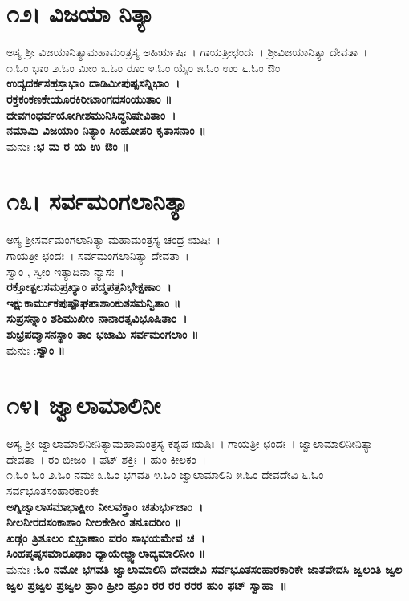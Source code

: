 \section{೧೨। ವಿಜಯಾ ನಿತ್ಯಾ}
ಅಸ್ಯ ಶ್ರೀ ವಿಜಯಾನಿತ್ಯಾಮಹಾಮಂತ್ರಸ್ಯ ಅಹಿರ್ಋಷಿಃ~। ಗಾಯತ್ರೀಛಂದಃ~। ಶ್ರೀವಿಜಯಾನಿತ್ಯಾ ದೇವತಾ~।\\
೧.ಓಂ ಭಾಂ ೨.ಓಂ ಮೀಂ ೩.ಓಂ ರೂಂ ೪.ಓಂ ಯೈಂ ೫.ಓಂ ಉಂ ೬.ಓಂ ಔಂ \\
{\bfseries ಉದ್ಯದರ್ಕಸಹಸ್ರಾಭಾಂ ದಾಡಿಮೀಪುಷ್ಪಸನ್ನಿಭಾಂ~।\\
ರಕ್ತಕಂಕಣಕೇಯೂರಕಿರೀಟಾಂಗದಸಂಯುತಾಂ ॥\\
ದೇವಗಂಧರ್ವಯೋಗೀಶಮುನಿಸಿದ್ಧನಿಷೇವಿತಾಂ~।\\
ನಮಾಮಿ ವಿಜಯಾಂ ನಿತ್ಯಾಂ ಸಿಂಹೋಪರಿ ಕೃತಾಸನಾಂ ॥\\}
ಮನುಃ :{\bfseries  ಭ ಮ ರ ಯ ಉ ಔಂ ॥}
\section{೧೩। ಸರ್ವಮಂಗಲಾನಿತ್ಯಾ}
ಅಸ್ಯ ಶ್ರೀಸರ್ವಮಂಗಲಾನಿತ್ಯಾ ಮಹಾಮಂತ್ರಸ್ಯ ಚಂದ್ರ ಋಷಿಃ~।\\ ಗಾಯತ್ರೀ ಛಂದಃ~। ಸರ್ವಮಂಗಲಾನಿತ್ಯಾ ದೇವತಾ~।\\
ಸ್ವಾಂ , ಸ್ವೀಂ ಇತ್ಯಾದಿನಾ ನ್ಯಾಸಃ~।\\
{\bfseries ರಕ್ತೋತ್ಪಲಸಮಪ್ರಖ್ಯಾಂ ಪದ್ಮಪತ್ರನಿಭೇಕ್ಷಣಾಂ~।\\
ಇಕ್ಷುಕಾರ್ಮುಕಪುಷ್ಪೌಘಪಾಶಾಂಕುಶಸಮನ್ವಿತಾಂ ॥\\
ಸುಪ್ರಸನ್ನಾಂ ಶಶಿಮುಖೀಂ ನಾನಾರತ್ನವಿಭೂಷಿತಾಂ~।\\
ಶುಭ್ರಪದ್ಮಾಸನಸ್ಥಾಂ ತಾಂ ಭಜಾಮಿ ಸರ್ವಮಂಗಲಾಂ ॥\\}
ಮನುಃ :{\bfseries  ಸ್ವೌಂ ॥}
\section{೧೪। ಜ್ವಾಲಾಮಾಲಿನೀ}
ಅಸ್ಯ ಶ್ರೀ ಜ್ವಾಲಾಮಾಲಿನೀನಿತ್ಯಾಮಹಾಮಂತ್ರಸ್ಯ ಕಶ್ಯಪ ಋಷಿಃ~। ಗಾಯತ್ರೀ ಛಂದಃ~। ಜ್ವಾಲಾಮಾಲಿನೀನಿತ್ಯಾ ದೇವತಾ~। ರಂ ಬೀಜಂ~। ಫಟ್ ಶಕ್ತಿಃ~। ಹುಂ ಕೀಲಕಂ~।\\
೧.ಓಂ ಓಂ ೨.ಓಂ ನಮಃ ೩.ಓಂ ಭಗವತಿ ೪.ಓಂ ಜ್ವಾಲಾಮಾಲಿನಿ ೫.ಓಂ ದೇವದೇವಿ ೬.ಓಂ ಸರ್ವಭೂತಸಂಹಾರಕಾರಿಕೇ \\
{\bfseries ಅಗ್ನಿಜ್ವಾಲಾಸಮಾಭಾಕ್ಷೀಂ ನೀಲವಕ್ತ್ರಾಂ ಚತುರ್ಭುಜಾಂ~।\\ನೀಲನೀರದಸಂಕಾಶಾಂ ನೀಲಕೇಶೀಂ ತನೂದರೀಂ ॥\\
ಖಡ್ಗಂ ತ್ರಿಶೂಲಂ ಬಿಭ್ರಾಣಾಂ ವರಂ ಸಾಭಯಮೇವ ಚ~।\\ಸಿಂಹಪೃಷ್ಠಸಮಾರೂಢಾಂ ಧ್ಯಾಯೇಜ್ಜ್ವಾಲಾದ್ಯಮಾಲಿನೀಂ ॥\\}
ಮನುಃ :{\bfseries  ಓಂ ನಮೋ ಭಗವತಿ ಜ್ವಾಲಾಮಾಲಿನಿ ದೇವದೇವಿ ಸರ್ವಭೂತಸಂಹಾರಕಾರಿಕೇ ಜಾತವೇದಸಿ ಜ್ವಲಂತಿ ಜ್ವಲ ಜ್ವಲ ಪ್ರಜ್ವಲ ಪ್ರಜ್ವಲ ಹ್ರಾಂ ಹ್ರೀಂ ಹ್ರೂಂ ರರ ರರ ರರರ ಹುಂ ಫಟ್ ಸ್ವಾಹಾ~॥}
